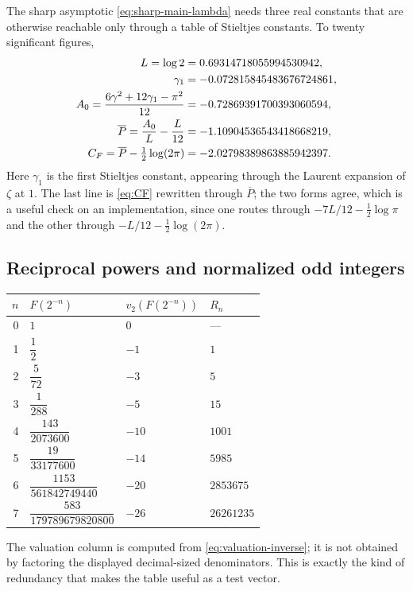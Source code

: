 \documentclass[11pt,oneside]{article}
\theoremstyle{definition}
\theoremstyle{remark}
\newcommand{\vtwo}{v_2}
\begin{document}
The sharp asymptotic \eqref{eq:sharp-main-lambda} needs three real constants that are
otherwise reachable only through a table of Stieltjes constants.  To twenty significant
figures,
\begin{align}
 L=\log2&=0.69314718055994530942,                          \notag\\
 \gamma_1&=-0.072815845483676724861,                       \notag\\
 A_0=\frac{6\gamma^2+12\gamma_1-\pi^2}{12}
   &=-0.72869391700393060594,                              \label{eq:data-A0-numeric}\\
 \overline P=\frac{A_0}{L}-\frac{L}{12}
   &=-1.10904536543418668219,                              \notag\\
 C_F=\overline P-\tfrac12\log(2\pi)
   &=-2.02798389863885942397.                              \notag
\end{align}
Here $\gamma_1$ is the first Stieltjes constant, appearing through the Laurent expansion of
$\zeta$ at $1$.  The last line is \eqref{eq:CF} rewritten through $\overline P$; the two
forms agree, which is a useful check on an implementation, since one routes through
$-7L/12-\tfrac12\log\pi$ and the other through $-L/12-\tfrac12\log(2\pi)$.

\subsection{Reciprocal powers and normalized odd integers}

\begin{longtable}{@{}rlll@{}}
\toprule
$n$ & $F(2^{-n})$ & $\vtwo(F(2^{-n}))$ & $R_n$\\
\midrule
\endhead
0 & $1$ & $0$ & ---\\[0.3ex]
1 & $\dfrac12$ & $-1$ & $1$\\[0.8ex]
2 & $\dfrac5{72}$ & $-3$ & $5$\\[0.8ex]
3 & $\dfrac1{288}$ & $-5$ & $15$\\[0.8ex]
4 & $\dfrac{143}{2073600}$ & $-10$ & $1001$\\[0.8ex]
5 & $\dfrac{19}{33177600}$ & $-14$ & $5985$\\[0.8ex]
6 & $\dfrac{1153}{561842749440}$ & $-20$ & $2853675$\\[0.8ex]
7 & $\dfrac{583}{179789679820800}$ & $-26$ & $26261235$\\
\bottomrule
\end{longtable}

The valuation column is computed from \eqref{eq:valuation-inverse}; it is not obtained by
factoring the displayed decimal-sized denominators.  This is exactly the kind of redundancy
that makes the table useful as a test vector.
\end{document}

